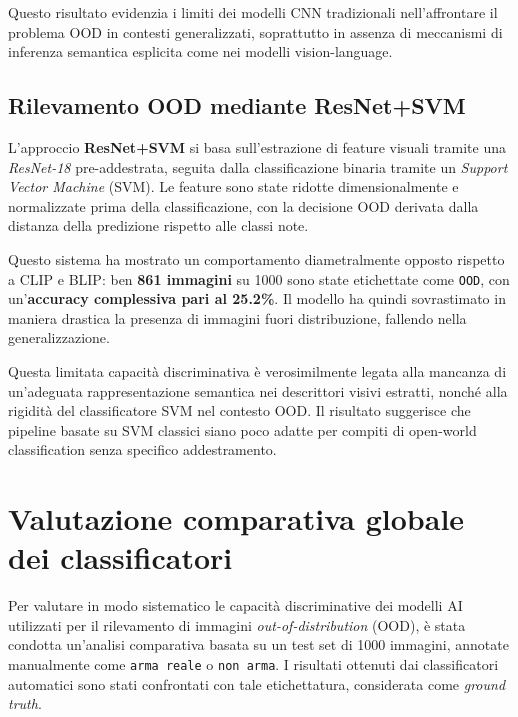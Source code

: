 \medskip

Questo risultato evidenzia i limiti dei modelli CNN tradizionali nell’affrontare il problema OOD in contesti generalizzati, soprattutto in assenza di meccanismi di inferenza semantica esplicita come nei modelli vision-language.




\subsection{Rilevamento OOD mediante ResNet+SVM}
\label{sec:ood-resnet-svm}

L’approccio \textbf{ResNet+SVM} si basa sull’estrazione di feature visuali tramite una \textit{ResNet-18} pre-addestrata, seguita dalla classificazione binaria tramite un \textit{Support Vector Machine} (SVM). Le feature sono state ridotte dimensionalmente e normalizzate prima della classificazione, con la decisione OOD derivata dalla distanza della predizione rispetto alle classi note.

Questo sistema ha mostrato un comportamento diametralmente opposto rispetto a CLIP e BLIP: ben \textbf{861 immagini} su 1000 sono state etichettate come \texttt{OOD}, con un’\textbf{accuracy complessiva pari al 25.2\%}. Il modello ha quindi sovrastimato in maniera drastica la presenza di immagini fuori distribuzione, fallendo nella generalizzazione.

\medskip

Questa limitata capacità discriminativa è verosimilmente legata alla mancanza di un'adeguata rappresentazione semantica nei descrittori visivi estratti, nonché alla rigidità del classificatore SVM nel contesto OOD. Il risultato suggerisce che pipeline basate su SVM classici siano poco adatte per compiti di open-world classification senza specifico addestramento.



\section{Valutazione comparativa globale dei classificatori}
\label{sec:global-evaluation}

Per valutare in modo sistematico le capacità discriminative dei modelli AI utilizzati per il rilevamento di immagini \textit{out-of-distribution} (OOD), è stata condotta un’analisi comparativa basata su un test set di 1000 immagini, annotate manualmente come \texttt{arma reale} o \texttt{non arma}. I risultati ottenuti dai classificatori automatici sono stati confrontati con tale etichettatura, considerata come \textit{ground truth}.

